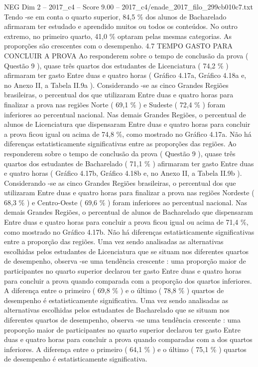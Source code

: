 \begin{textsample}{NEG Dim 2 – 2017\_c4 – Score 9.00 – 2017\_c4/enade\_2017\_filo\_299cb010c7.txt}
Tendo -se em conta o quarto superior, 84,5 \% dos alunos de Bacharelado afirmaram ter estudado e aprendido muitos ou todos os conteúdos.
No outro extremo, no primeiro quarto, 41,0 \% optaram pelas mesmas categorias.
As proporções são crescentes com o desempenho. 4.7 TEMPO GASTO PARA CONCLUIR A PROVA Ao responderem sobre o tempo de conclusão da prova ( Questão 9 ), quase três quartos dos estudantes de Licenciatura ( 74,2 \% ) afirmaram ter gasto Entre duas e quatro horas ( Gráfico 4.17a, Gráfico 4.18a e, no Anexo II, a Tabela II.9a ).
Considerando -se as cinco Grandes Regiões brasileiras, o percentual dos que utilizaram Entre duas e quatro horas para finalizar a prova nas regiões Norte ( 69,1 \% ) e Sudeste ( 72,4 \% ) foram inferiores ao percentual nacional.
Nas demais Grandes Regiões, o percentual de alunos de Licenciatura que dispensaram Entre duas e quatro horas para concluir a prova ficou igual ou acima de 74,8 \%, como mostrado no Gráfico 4.17a.
Não há diferenças estatisticamente significativas entre as proporções das regiões.
Ao responderem sobre o tempo de conclusão da prova ( Questão 9 ), quase três quartos dos estudantes de Bacharelado ( 71,1 \% ) afirmaram ter gasto Entre duas e quatro horas ( Gráfico 4.17b, Gráfico 4.18b e, no Anexo II, a Tabela II.9b ).
Considerando -se as cinco Grandes Regiões brasileiras, o percentual dos que utilizaram Entre duas e quatro horas para finalizar a prova nas regiões Nordeste ( 68,3 \% ) e Centro-Oeste ( 69,6 \% ) foram inferiores ao percentual nacional.
Nas demais Grandes Regiões, o percentual de alunos de Bacharelado que dispensaram Entre duas e quatro horas para concluir a prova ficou igual ou acima de 71,4 \%, como mostrado no Gráfico 4.17b.
Não há diferenças estatisticamente significativas entre a proporção das regiões.
Uma vez sendo analisadas as alternativas escolhidas pelos estudantes de Licenciatura que se situam nos diferentes quartos de desempenho, observa -se uma tendência crescente : uma proporção maior de participantes no quarto superior declarou ter gasto Entre duas e quatro horas para concluir a prova quando comparada com a proporção dos quartos inferiores.
A diferença entre o primeiro ( 69,8 \% ) e o último ( 78,8 \% ) quartos de desempenho é estatisticamente significativa.
Uma vez sendo analisadas as alternativas escolhidas pelos estudantes de Bacharelado que se situam nos diferentes quartos de desempenho, observa -se uma tendência crescente : uma proporção maior de participantes no quarto superior declarou ter gasto Entre duas e quatro horas para concluir a prova quando comparadas com a dos quartos inferiores.
A diferença entre o primeiro ( 64,1 \% ) e o último ( 75,1 \% ) quartos de desempenho é estatisticamente significativa.

\end{textsample}
